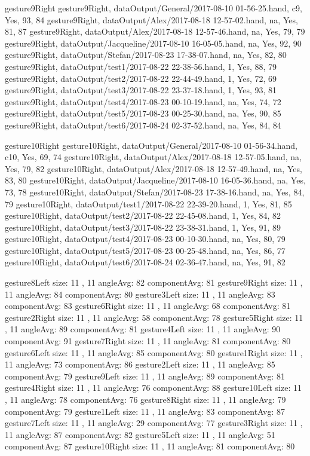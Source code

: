 gesture9Right
gesture9Right, dataOutput/General/2017-08-10 01-56-25.hand, c9, Yes, 93, 84
gesture9Right, dataOutput/Alex/2017-08-18 12-57-02.hand, na, Yes, 81, 87
gesture9Right, dataOutput/Alex/2017-08-18 12-57-46.hand, na, Yes, 79, 79
gesture9Right, dataOutput/Jacqueline/2017-08-10 16-05-05.hand, na, Yes, 92, 90
gesture9Right, dataOutput/Stefan/2017-08-23 17-38-07.hand, na, Yes, 82, 80
gesture9Right, dataOutput/test1/2017-08-22 22-38-56.hand, 1, Yes, 88, 79
gesture9Right, dataOutput/test2/2017-08-22 22-44-49.hand, 1, Yes, 72, 69
gesture9Right, dataOutput/test3/2017-08-22 23-37-18.hand, 1, Yes, 93, 81
gesture9Right, dataOutput/test4/2017-08-23 00-10-19.hand, na, Yes, 74, 72
gesture9Right, dataOutput/test5/2017-08-23 00-25-30.hand, na, Yes, 90, 85
gesture9Right, dataOutput/test6/2017-08-24 02-37-52.hand, na, Yes, 84, 84

gesture10Right
gesture10Right, dataOutput/General/2017-08-10 01-56-34.hand, c10, Yes, 69, 74
gesture10Right, dataOutput/Alex/2017-08-18 12-57-05.hand, na, Yes, 79, 82
gesture10Right, dataOutput/Alex/2017-08-18 12-57-49.hand, na, Yes, 83, 80
gesture10Right, dataOutput/Jacqueline/2017-08-10 16-05-36.hand, na, Yes, 73, 78
gesture10Right, dataOutput/Stefan/2017-08-23 17-38-16.hand, na, Yes, 84, 79
gesture10Right, dataOutput/test1/2017-08-22 22-39-20.hand, 1, Yes, 81, 85
gesture10Right, dataOutput/test2/2017-08-22 22-45-08.hand, 1, Yes, 84, 82
gesture10Right, dataOutput/test3/2017-08-22 23-38-31.hand, 1, Yes, 91, 89
gesture10Right, dataOutput/test4/2017-08-23 00-10-30.hand, na, Yes, 80, 79
gesture10Right, dataOutput/test5/2017-08-23 00-25-48.hand, na, Yes, 86, 77
gesture10Right, dataOutput/test6/2017-08-24 02-36-47.hand, na, Yes, 91, 82


gesture8Left size: 11 , 11 angleAvg: 82 componentAvg: 81
gesture9Right size: 11 , 11 angleAvg: 84 componentAvg: 80
gesture3Left size: 11 , 11 angleAvg: 83 componentAvg: 83
gesture6Right size: 11 , 11 angleAvg: 68 componentAvg: 81
gesture2Right size: 11 , 11 angleAvg: 58 componentAvg: 78
gesture5Right size: 11 , 11 angleAvg: 89 componentAvg: 81
gesture4Left size: 11 , 11 angleAvg: 90 componentAvg: 91
gesture7Right size: 11 , 11 angleAvg: 81 componentAvg: 80
gesture6Left size: 11 , 11 angleAvg: 85 componentAvg: 80
gesture1Right size: 11 , 11 angleAvg: 73 componentAvg: 86
gesture2Left size: 11 , 11 angleAvg: 85 componentAvg: 79
gesture9Left size: 11 , 11 angleAvg: 89 componentAvg: 81
gesture4Right size: 11 , 11 angleAvg: 76 componentAvg: 88
gesture10Left size: 11 , 11 angleAvg: 78 componentAvg: 76
gesture8Right size: 11 , 11 angleAvg: 79 componentAvg: 79
gesture1Left size: 11 , 11 angleAvg: 83 componentAvg: 87
gesture7Left size: 11 , 11 angleAvg: 29 componentAvg: 77
gesture3Right size: 11 , 11 angleAvg: 87 componentAvg: 82
gesture5Left size: 11 , 11 angleAvg: 51 componentAvg: 87
gesture10Right size: 11 , 11 angleAvg: 81 componentAvg: 80

